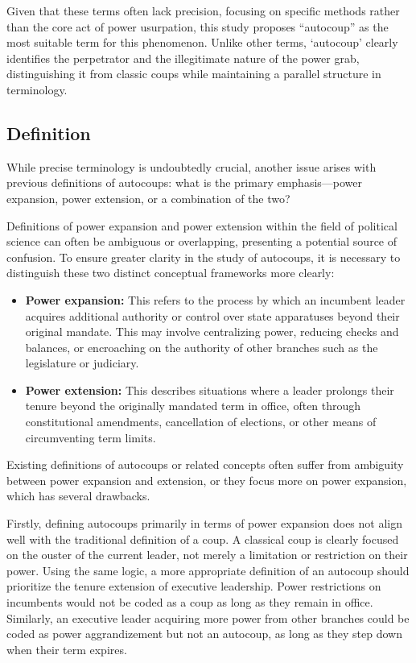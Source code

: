 \documentclass[
  12pt,
]{report}
\begin{document}
Given that these terms often lack precision, focusing on specific
methods rather than the core act of power usurpation, this study
proposes ``autocoup'' as the most suitable term for this phenomenon.
Unlike other terms, `autocoup' clearly identifies the perpetrator and
the illegitimate nature of the power grab, distinguishing it from
classic coups while maintaining a parallel structure in terminology.

\subsection{Definition}\label{sec-definition}

While precise terminology is undoubtedly crucial, another issue arises
with previous definitions of autocoups: what is the primary
emphasis---power expansion, power extension, or a combination of the
two?

Definitions of power expansion and power extension within the field of
political science can often be ambiguous or overlapping, presenting a
potential source of confusion. To ensure greater clarity in the study of
autocoups, it is necessary to distinguish these two distinct conceptual
frameworks more clearly:

\begin{itemize}
\item
  \textbf{Power expansion:} This refers to the process by which an
  incumbent leader acquires additional authority or control over state
  apparatuses beyond their original mandate. This may involve
  centralizing power, reducing checks and balances, or encroaching on
  the authority of other branches such as the legislature or judiciary.
\item
  \textbf{Power extension:} This describes situations where a leader
  prolongs their tenure beyond the originally mandated term in office,
  often through constitutional amendments, cancellation of elections, or
  other means of circumventing term limits.
\end{itemize}

Existing definitions of autocoups or related concepts often suffer from
ambiguity between power expansion and extension, or they focus more on
power expansion, which has several drawbacks.

Firstly, defining autocoups primarily in terms of power expansion does
not align well with the traditional definition of a coup. A classical
coup is clearly focused on the ouster of the current leader, not merely
a limitation or restriction on their power. Using the same logic, a more
appropriate definition of an autocoup should prioritize the tenure
extension of executive leadership. Power restrictions on incumbents
would not be coded as a coup as long as they remain in office.
Similarly, an executive leader acquiring more power from other branches
could be coded as power aggrandizement but not an autocoup, as long as
they step down when their term expires.
\end{document}
